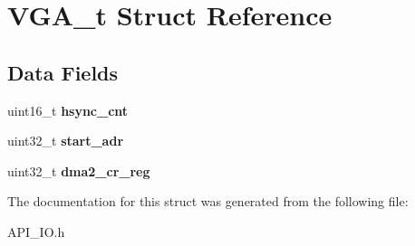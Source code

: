 \hypertarget{struct_v_g_a__t}{}\section{V\+G\+A\+\_\+t Struct Reference}
\label{struct_v_g_a__t}
\subsection*{Data Fields}
\begin{DoxyCompactItemize}
\item 
\mbox{\label{struct_v_g_a__t_a649bc185f93377aec7fa1c136dd2add0}} 
uint16\+\_\+t {\bfseries hsync\+\_\+cnt}
\item 
\mbox{\label{struct_v_g_a__t_a7f47a855ae47844b419d75797f00fbbb}} 
uint32\+\_\+t {\bfseries start\+\_\+adr}
\item 
\mbox{\label{struct_v_g_a__t_a1fc3c1405cc22f5d4fc21eb58c47c06a}} 
uint32\+\_\+t {\bfseries dma2\+\_\+cr\+\_\+reg}
\end{DoxyCompactItemize}


The documentation for this struct was generated from the following file\+:\begin{DoxyCompactItemize}
\item 
A\+P\+I\+\_\+\+I\+O.\+h\end{DoxyCompactItemize}

